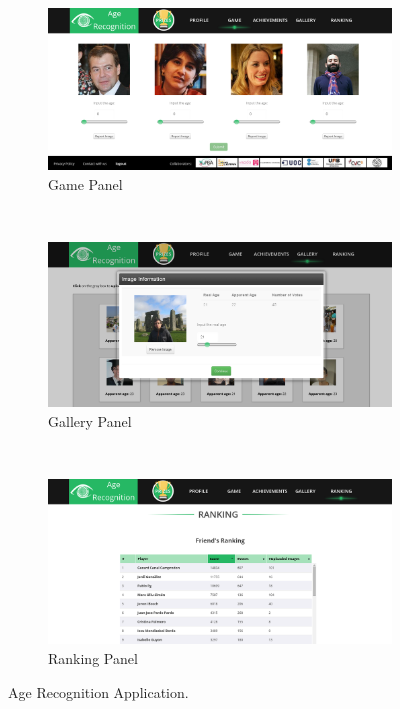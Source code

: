 \begin{figure}[!h]
	\centering
	\begin{subfigure}[b]{0.3\textwidth}
		\includegraphics[width=\textwidth]{figures/age_app_1}
		\caption{Game Panel}
		\label{fig:game}
	\end{subfigure}%
	~ %
	\begin{subfigure}[b]{0.3\textwidth}
		\includegraphics[width=\textwidth]{figures/age_app_2}
		\caption{Gallery Panel}
		\label{fig:gallery}
	\end{subfigure}
	~ %
	\begin{subfigure}[b]{0.3\textwidth}
		\includegraphics[width=\textwidth]{figures/age_app_3}
		\caption{Ranking Panel}
		\label{fig:ranking}
	\end{subfigure}
	\caption{Age Recognition Application.} \label{fig:application}
\end{figure}

